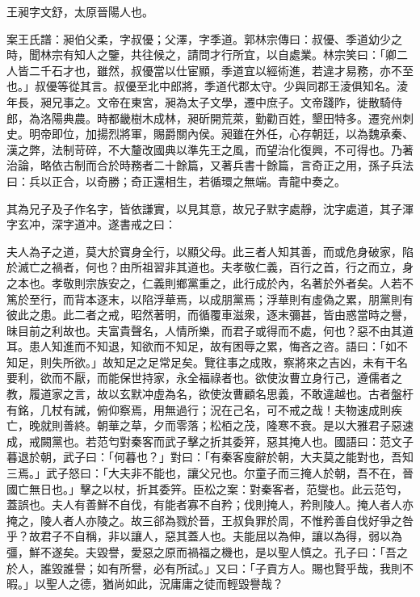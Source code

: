
\begin{pinyinscope}
王昶字文舒，太原晉陽人也。

案王氏譜：昶伯父柔，字叔優；父澤，字季道。郭林宗傳曰：叔優、季道幼少之時，聞林宗有知人之鑒，共往候之，請問才行所宜，以自處業。林宗笑曰：「卿二人皆二千石才也，雖然，叔優當以仕宦顯，季道宜以經術進，若違才易務，亦不至也。」叔優等從其言。叔優至北中郎將，季道代郡太守。少與同郡王淩俱知名。淩年長，昶兄事之。文帝在東宮，昶為太子文學，遷中庶子。文帝踐阼，徙散騎侍郎，為洛陽典農。時都畿樹木成林，昶斫開荒萊，勤勸百姓，墾田特多。遷兖州刺史。明帝即位，加揚烈將軍，賜爵關內侯。昶雖在外任，心存朝廷，以為魏承秦、漢之弊，法制苛碎，不大釐改國典以準先王之風，而望治化復興，不可得也。乃著治論，略依古制而合於時務者二十餘篇，又著兵書十餘篇，言奇正之用，孫子兵法曰：兵以正合，以奇勝；奇正還相生，若循環之無端。青龍中奏之。

其為兄子及子作名字，皆依謙實，以見其意，故兄子默字處靜，沈字處道，其子渾字玄冲，深字道冲。遂書戒之曰：

夫人為子之道，莫大於寶身全行，以顯父母。此三者人知其善，而或危身破家，陷於滅亡之禍者，何也？由所祖習非其道也。夫孝敬仁義，百行之首，行之而立，身之本也。孝敬則宗族安之，仁義則鄉黨重之，此行成於內，名著於外者矣。人若不篤於至行，而背本逐末，以陷浮華焉，以成朋黨焉；浮華則有虛偽之累，朋黨則有彼此之患。此二者之戒，昭然著明，而循覆車滋衆，逐末彌甚，皆由惑當時之譽，昧目前之利故也。夫富貴聲名，人情所樂，而君子或得而不處，何也？惡不由其道耳。患人知進而不知退，知欲而不知足，故有困辱之累，悔吝之咨。語曰：「如不知足，則失所欲。」故知足之足常足矣。覽往事之成敗，察將來之吉凶，未有干名要利，欲而不厭，而能保世持家，永全福祿者也。欲使汝曹立身行己，遵儒者之教，履道家之言，故以玄默冲虛為名，欲使汝曹顧名思義，不敢違越也。古者盤杅有銘，几杖有誡，俯仰察焉，用無過行；況在己名，可不戒之哉！夫物速成則疾亡，晚就則善終。朝華之草，夕而零落；松栢之茂，隆寒不衰。是以大雅君子惡速成，戒闕黨也。若范匄對秦客而武子擊之折其委笄，惡其掩人也。國語曰：范文子暮退於朝，武子曰：「何暮也？」對曰：「有秦客廋辭於朝，大夫莫之能對也，吾知三焉。」武子怒曰：「大夫非不能也，讓父兄也。尔童子而三掩人於朝，吾不在，晉國亡無日也。」擊之以杖，折其委笄。臣松之案：對秦客者，范燮也。此云范匄，蓋誤也。夫人有善鮮不自伐，有能者寡不自矜；伐則掩人，矜則陵人。掩人者人亦掩之，陵人者人亦陵之。故三郤為戮於晉，王叔負罪於周，不惟矜善自伐好爭之咎乎？故君子不自稱，非以讓人，惡其蓋人也。夫能屈以為伸，讓以為得，弱以為彊，鮮不遂矣。夫毀譽，愛惡之原而禍福之機也，是以聖人慎之。孔子曰：「吾之於人，誰毀誰譽；如有所譽，必有所試。」又曰：「子貢方人。賜也賢乎哉，我則不暇。」以聖人之德，猶尚如此，況庸庸之徒而輕毀譽哉？


\end{pinyinscope}
